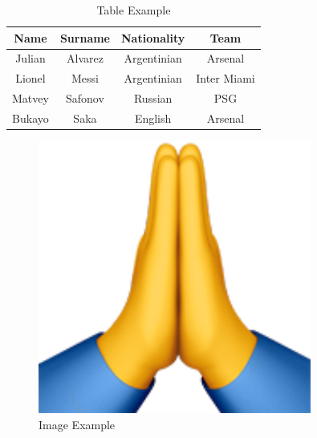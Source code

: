 \documentclass{article}
\begin{document}
\begin{table}[h]
\centering
\begin{tabular}{|c | c | c | c|}
\hline
Name & Surname & Nationality & Team \\
\hline
Julian & Alvarez & Argentinian & Arsenal \\
Lionel & Messi & Argentinian & Inter Miami \\
Matvey & Safonov & Russian & PSG \\
Bukayo & Saka & English & Arsenal \\
\hline
\end{tabular}
\caption{Table Example}
\end{table}
\begin{figure}[h]
\centering
\includegraphics[width=0.8\textwidth]{hand.png}
\caption{Image Example}
\end{figure}
\end{document}
